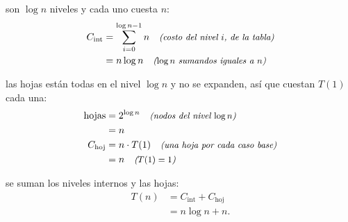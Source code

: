 \documentclass[11pt,letterpaper]{article}
\begin{document}
 son $\log n$ niveles y cada uno
cuesta $n$:
\begin{align*}
  C_{\text{int}} &= \sum_{i=0}^{\log n - 1} n
      \quad\text{\small\itshape (costo del nivel $i$, de la tabla)} \\
                 &= n \log n \quad\text{\small\itshape ($\log n$ sumandos iguales a $n$)}
\end{align*}

 las hojas están todas en el nivel $\log n$
y no se expanden, así que cuestan $T(1)$ cada una:
\begin{align*}
  \text{hojas} &= 2^{\log n} \quad\text{\small\itshape (nodos del nivel $\log n$)} \\
               &= n \\
  C_{\text{hoj}} &= n \cdot T(1) \quad\text{\small\itshape (una hoja por cada caso base)} \\
                 &= n \quad\text{\small\itshape ($T(1) = 1$)}
\end{align*}

 se suman los niveles internos y las hojas:
\begin{align*}
  T(n) &= C_{\text{int}} + C_{\text{hoj}} \\
       &= n \log n + n.
\end{align*}

\end{document}
